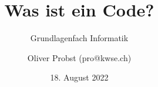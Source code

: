\documentclass{beamer}
\begin{document}
\title{Was ist ein Code?}
\subtitle{Grundlagenfach Informatik}
\author{Oliver Probst (pro@kwse.ch)}
\date{18. August 2022}

\begin{frame}
\titlepage
\end{frame}

\end{document}

